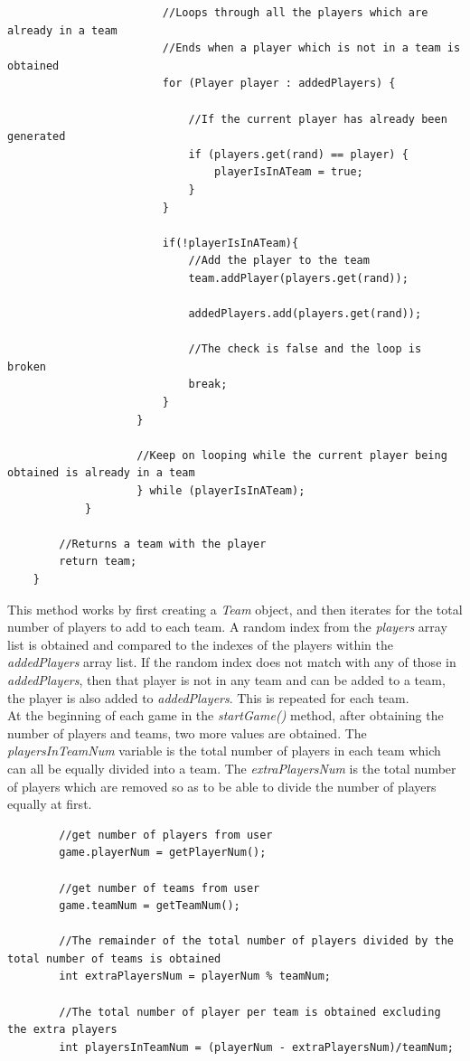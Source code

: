 \documentclass[a4paper,12pt]{extarticle}
\begin{document}
\begin{lstlisting}
                        //Loops through all the players which are already in a team
                        //Ends when a player which is not in a team is obtained
                        for (Player player : addedPlayers) {

                            //If the current player has already been generated
                            if (players.get(rand) == player) {
                                playerIsInATeam = true;
                            }
                        }

                        if(!playerIsInATeam){
                            //Add the player to the team
                            team.addPlayer(players.get(rand));

                            addedPlayers.add(players.get(rand));

                            //The check is false and the loop is broken
                            break;
                        }
                    }

                    //Keep on looping while the current player being obtained is already in a team
                    } while (playerIsInATeam);
            }

        //Returns a team with the player
        return team;
    }
\end{lstlisting}

This method works by first creating a \textit{Team} object, and then iterates for the total number of players to add to each team. A random index from the \textit{players} array list is obtained and compared to the indexes of the players within the \textit{addedPlayers} array list. If the random index does not match with any of those in \textit{addedPlayers}, then that player is not in any team and can be added to a team, the player is also added to \textit{addedPlayers}. This is repeated for each team.\\

At the beginning of each game in the \textit{startGame()} method, after obtaining the number of players and teams, two more values are obtained. The \textit{playersInTeamNum} variable is the total number of players in each team which can all be equally divided into a team. The \textit{extraPlayersNum} is the total number of players which are removed so as to be able to divide the number of players equally at first. 

\begin{lstlisting}
        //get number of players from user
        game.playerNum = getPlayerNum();

        //get number of teams from user
        game.teamNum = getTeamNum();

        //The remainder of the total number of players divided by the total number of teams is obtained
        int extraPlayersNum = playerNum % teamNum;

        //The total number of player per team is obtained excluding the extra players
        int playersInTeamNum = (playerNum - extraPlayersNum)/teamNum;


\end{lstlisting}
\end{document}
